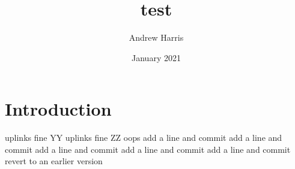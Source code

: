 \documentclass{article}
\title{test}
\author{Andrew Harris}
\date{January 2021}
\begin{document}
\maketitle

\section{Introduction}
uplinks fine YY
uplinks fine ZZ
oops
add a line and commit
add a line and commit
add a line and commit
add a line and commit
add a line and commit
revert to an earlier version
\end{document}
